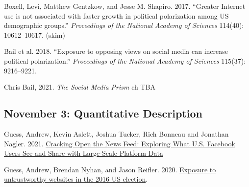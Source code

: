 \vspace{-.1in}\documentclass[11pt]{article}
\begin{document}
\noindent Boxell, Levi, Matthew Gentzkow, and Jesse M. Shapiro. 2017. ``Greater Internet use is not associated with faster growth in political polarization among US demographic groups.''
\emph{Proceedings of the National Academy of Sciences} 114(40): 10612--10617. (skim)


\noindent Bail et al. 2018. ``Exposure to opposing views on social media can increase political polarization.'' \emph{Proceedings of the National Academy of Sciences} 115(37): 9216--9221.

\noindent Chris Bail, 2021. \textit{The Social Media Prism} ch TBA



%
%
%
%


\subsection*{November 3: Quantitative Description}






Guess, Andrew, Kevin Aslett, Joshua Tucker, Rich Bonneau and Jonathan Nagler. 2021. \href{https://journalqd.org/article/view/2586}{Cracking Open the News Feed:	Exploring What U.S. Facebook Users See and Share with Large-Scale Platform Data}

\noindent Guess, Andrew, Brendan Nyhan, and Jason Reifler. 2020. \href{https://www.nature.com/articles/s41562-020-0833-x?proof=t}{Exposure to untrustworthy websites in the 2016 US election}.
\end{document}
